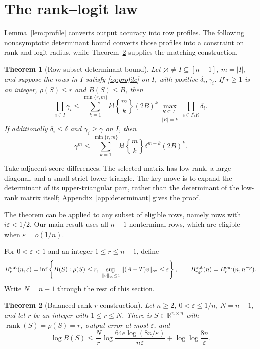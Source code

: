 \documentclass[10pt]{article} %
\newtheorem{theorem}{Theorem}
\theoremstyle{definition}
\DeclareMathOperator{\rank}{rank}
\newcommand{\R}{\mathbb R}
\newcommand{\Stirling}[2]{\genfrac{\{}{\}}{0pt}{}{#1}{#2}}
\begin{document}
\section{The rank--logit law}

Lemma~\ref{lem:profile} converts output accuracy into row profiles.  The
following nonasymptotic determinant bound converts those profiles into a
constraint on rank and logit radius, while Theorem~\ref{thm:upper} supplies
the matching construction.

\begin{theorem}[Row-subset determinant bound]\label{thm:subset}
Let \(\varnothing\ne I\subseteq[n-1]\), \(m=|I|\), and suppose the rows in
\(I\) satisfy \eqref{eq:profile} on \(I\), with positive
\(\delta_i,\gamma_i\).  If \(r\ge1\) is an integer,
\(\rho(S)\le r\) and \(B(S)\le B\), then
\begin{equation}\label{eq:weighted}
 \prod_{i\in I}\gamma_i
 \le
 \sum_{k=1}^{\min\{r,m\}}
 k!\Stirling{m}{k}(2B)^k
 \max_{\substack{R\subseteq I\\|R|=k}}
 \prod_{i\in I\setminus R}\delta_i .
\end{equation}
If additionally \(\delta_i\le\delta\) and
\(\gamma_i\ge\gamma\) on \(I\), then
\begin{equation}\label{eq:constant}
 \gamma^m\le
 \sum_{k=1}^{\min\{r,m\}}
 k!\Stirling{m}{k}\delta^{m-k}(2B)^k .
\end{equation}
\end{theorem}

Take adjacent score differences.  The selected matrix has low rank, a large
diagonal, and a small strict lower triangle.  The key move is to expand the
determinant of its upper-triangular part, rather than the determinant of the
low-rank matrix itself; Appendix~\ref{app:determinant} gives the proof.

The theorem can be applied to any subset of eligible rows, namely rows with
\(i\varepsilon<1/2\).  Our main result uses all \(n-1\) nonterminal rows,
which are eligible when \(\varepsilon=o(1/n)\).

For \(0<\varepsilon<1\) and an integer \(1\le r\le n-1\), define
\[
 B^{\rm out}_{r}(n,\varepsilon)=\inf\left\{B(S):
 \rho(S)\le r,\ 
 \sup_{\|v\|_\infty\le1}\|(A-T)v\|_\infty\le\varepsilon\right\},
 \qquad B^{\rm out}_{r,p}(n)=B^{\rm out}_{r}(n,n^{-p}).
\]
Write \(N=n-1\) through the rest of this section.

\begin{theorem}[Balanced rank-\(r\) construction]\label{thm:upper}
Let \(n\ge2\), \(0<\varepsilon\le1/n\), \(N=n-1\), and
let \(r\) be an integer with \(1\le r\le N\).  There is
\(S\in\R^{n\times n}\) with
\(\rank(S)=\rho(S)=r\), output error at most \(\varepsilon\), and
\begin{equation}\label{eq:upperbudget}
 \log B(S)\le
 \frac Nr\log\frac{64e\log(8n/\varepsilon)}{n\varepsilon}
 +\log\log\frac{8n}{\varepsilon}.
\end{equation}
\end{theorem}
\end{document}
